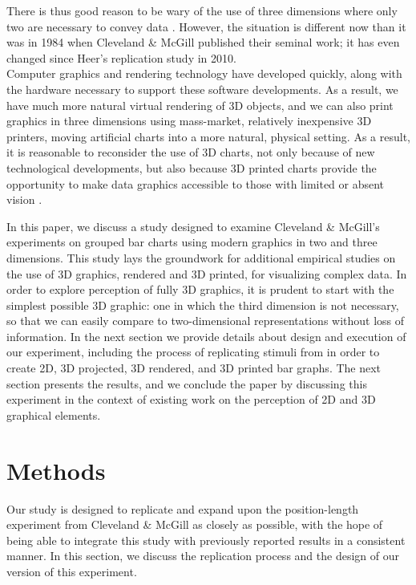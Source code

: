 \documentclass[letterpaper,inpress,dvipsnames]{jdsart}
\begin{document}
There is thus good reason to be wary of the use of three dimensions where only two are necessary to convey data \citep{huffHowLieStatistics1954}.
However, the situation is different now than it was in 1984 when Cleveland \& McGill published their seminal work; it has even changed since Heer's replication study \citeyearpar{heerCrowdsourcingGraphicalPerception2010b} in 2010.\\
Computer graphics and rendering technology have developed quickly, along with the hardware necessary to support these software developments.
As a result, we have much more natural virtual rendering of 3D objects, and we can also print graphics in three dimensions using mass-market, relatively inexpensive 3D printers, moving artificial charts into a more natural, physical setting.
As a result, it is reasonable to reconsider the use of 3D charts, not only because of new technological developments, but also because 3D printed charts provide the opportunity to make data graphics accessible to those with limited or absent vision \citep{fleetHowTactileGraphics2023}.

In this paper, we discuss a study designed to examine Cleveland \& McGill's experiments on grouped bar charts using modern graphics in two and three dimensions. This study lays the groundwork for additional empirical studies on the use of 3D graphics, rendered and 3D printed, for visualizing complex data. In order to explore perception of fully 3D graphics, it is prudent to start with the simplest possible 3D graphic: one in which the third dimension is not necessary, so that we can easily compare to two-dimensional representations without loss of information.
In the next section we provide details about design and execution of our experiment, including the process of replicating stimuli from \citet{clevelandGraphical1984} in order to create 2D, 3D projected, 3D rendered, and 3D printed bar graphs. The next section presents the results, and we conclude the paper by discussing this experiment in the context of existing work on the perception of 2D and 3D graphical elements.

\hypertarget{methods}{%
\section{Methods}\label{methods}}

Our study is designed to replicate and expand upon the position-length experiment from Cleveland \& McGill as closely as possible, with the hope of being able to integrate this study with previously reported results in a consistent manner.
In this section, we discuss the replication process and the design of our version of this experiment.
\end{document}
